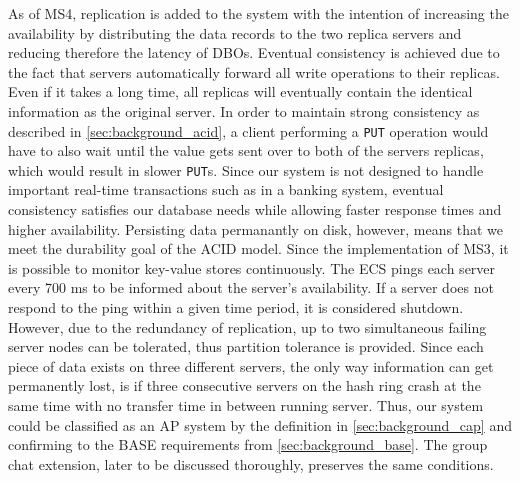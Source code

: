As of MS4, replication is added to the system with the intention of increasing the availability by distributing the data records to the two replica servers and reducing therefore the latency of DBOs. Eventual consistency is achieved due to the fact that servers automatically forward all write operations to their replicas. Even if it takes a long time, all replicas will eventually contain the identical information as the original server. In order to maintain strong consistency as described in \ref{sec:background_acid}, a client performing a \texttt{PUT} operation would have to also wait until the value gets sent over to both of the servers replicas, which would result in slower \texttt{PUT}s. Since our system is not designed to handle important real-time transactions such as in a banking system, eventual consistency satisfies our database needs while allowing faster response times and higher availability. Persisting data permanantly on disk, however, means that we meet the durability goal of the ACID model.
Since the implementation of MS3, it is possible to monitor key-value stores continuously. The ECS pings each server every 700 ms to be informed about the server's availability. If a server does not respond to the ping within a given time period, it is considered shutdown. However, due to the redundancy of replication,
up to two simultaneous failing server nodes can be tolerated, thus partition tolerance is provided. Since each piece of data exists on three different servers, the only way information can get permanently lost, is if three consecutive servers on the hash ring crash at the same time with no transfer time in between running server.
Thus, our system could be classified as an AP system by the definition in \ref{sec:background_cap} and confirming to the BASE requirements from \ref{sec:background_base}.
The group chat extension, later to be discussed thoroughly, preserves the same conditions.

